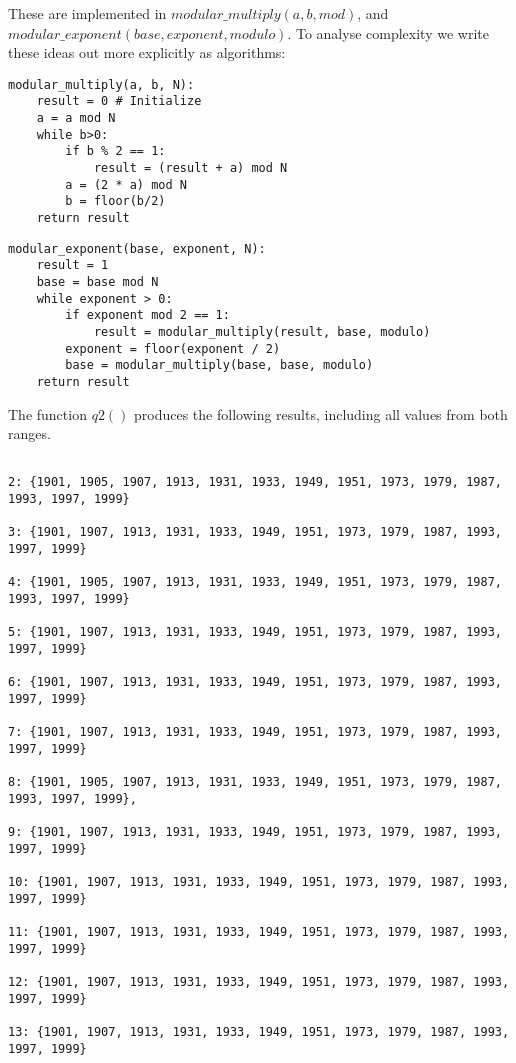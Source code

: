 \documentclass[10pt,a4paper]{report}
\begin{document}
These are implemented in $modular\_multiply(a,b,mod)$, and \\ $modular\_exponent(base,exponent,modulo)$. To analyse complexity we write these ideas out more explicitly as algorithms:

\begin{verbatim}
modular_multiply(a, b, N):
    result = 0 # Initialize
    a = a mod N
    while b>0:
        if b % 2 == 1:
            result = (result + a) mod N
        a = (2 * a) mod N
        b = floor(b/2)
    return result

\end{verbatim}

\begin{verbatim}
modular_exponent(base, exponent, N):
    result = 1
    base = base mod N
    while exponent > 0:
        if exponent mod 2 == 1:
            result = modular_multiply(result, base, modulo)
        exponent = floor(exponent / 2)
        base = modular_multiply(base, base, modulo)
    return result
\end{verbatim}    

The function $q2()$ produces the following results, including all values from both ranges.

\begin{lstlisting}[breaklines]

2: {1901, 1905, 1907, 1913, 1931, 1933, 1949, 1951, 1973, 1979, 1987, 1993, 1997, 1999}

3: {1901, 1907, 1913, 1931, 1933, 1949, 1951, 1973, 1979, 1987, 1993, 1997, 1999}

4: {1901, 1905, 1907, 1913, 1931, 1933, 1949, 1951, 1973, 1979, 1987, 1993, 1997, 1999}

5: {1901, 1907, 1913, 1931, 1933, 1949, 1951, 1973, 1979, 1987, 1993, 1997, 1999}

6: {1901, 1907, 1913, 1931, 1933, 1949, 1951, 1973, 1979, 1987, 1993, 1997, 1999}

7: {1901, 1907, 1913, 1931, 1933, 1949, 1951, 1973, 1979, 1987, 1993, 1997, 1999}
 
8: {1901, 1905, 1907, 1913, 1931, 1933, 1949, 1951, 1973, 1979, 1987, 1993, 1997, 1999}, 
 
9: {1901, 1907, 1913, 1931, 1933, 1949, 1951, 1973, 1979, 1987, 1993, 1997, 1999}
 
10: {1901, 1907, 1913, 1931, 1933, 1949, 1951, 1973, 1979, 1987, 1993, 1997, 1999}
 
11: {1901, 1907, 1913, 1931, 1933, 1949, 1951, 1973, 1979, 1987, 1993, 1997, 1999}
 
12: {1901, 1907, 1913, 1931, 1933, 1949, 1951, 1973, 1979, 1987, 1993, 1997, 1999}
 
13: {1901, 1907, 1913, 1931, 1933, 1949, 1951, 1973, 1979, 1987, 1993, 1997, 1999}
 
\end{lstlisting}
\end{document}

